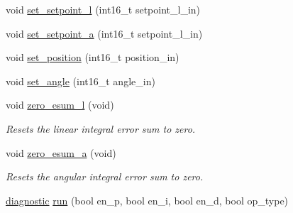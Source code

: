 \begin{DoxyCompactItemize}
\item 
void \mbox{\hyperlink{classmotorDriver_a574c77f9c8b357f0fba8f1d477660c8c}{set\+\_\+setpoint\+\_\+l}} (int16\+\_\+t setpoint\+\_\+l\+\_\+in)
\item 
void \mbox{\hyperlink{classmotorDriver_a6e71895792955acca1ed81eca952d767}{set\+\_\+setpoint\+\_\+a}} (int16\+\_\+t setpoint\+\_\+l\+\_\+in)
\item 
void \mbox{\hyperlink{classmotorDriver_a3aeee35e6c70082133a9e45299742e37}{set\+\_\+position}} (int16\+\_\+t position\+\_\+in)
\item 
void \mbox{\hyperlink{classmotorDriver_aed116408f7a7498a96a69dc5b14930aa}{set\+\_\+angle}} (int16\+\_\+t angle\+\_\+in)
\item 
void \mbox{\hyperlink{classmotorDriver_a32a97045e477c63f1f67d5e398b7e8fd}{zero\+\_\+esum\+\_\+l}} (void)
\begin{DoxyCompactList}\small\item\em Resets the linear integral error sum to zero. \end{DoxyCompactList}\item 
void \mbox{\hyperlink{classmotorDriver_ae5ac04723b2ceac14fe4c12f9f163cd0}{zero\+\_\+esum\+\_\+a}} (void)
\begin{DoxyCompactList}\small\item\em Resets the angular integral error sum to zero. \end{DoxyCompactList}\item 
\mbox{\hyperlink{structdiagnostic}{diagnostic}} \mbox{\hyperlink{classmotorDriver_a49437362ce00be4bd428d4e7e46fd477}{run}} (bool en\+\_\+p, bool en\+\_\+i, bool en\+\_\+d, bool op\+\_\+type)
\end{DoxyCompactItemize}
